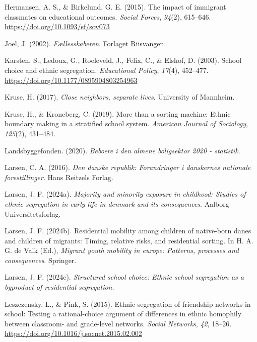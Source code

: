 \documentclass[
]{book}
\newlength{\cslhangindent}
\newenvironment{CSLReferences}[2] %
 {\begin{list}{}{%
  \setlength{\itemindent}{0pt}
  \setlength{\leftmargin}{0pt}
  \setlength{\parsep}{0pt}
  \ifodd #1
   \setlength{\leftmargin}{\cslhangindent}
   \setlength{\itemindent}{-1\cslhangindent}
  \fi
  \setlength{\itemsep}{#2\baselineskip}}}
 {\end{list}}
\begin{document}
\begin{CSLReferences}{1}{0}
Hermansen, A. S., \& Birkelund, G. E. (2015). The impact of immigrant classmates on educational outcomes. \emph{Social Forces}, \emph{94}(2), 615--646. \url{https://doi.org/10.1093/sf/sov073}

Joel, J. (2002). \emph{Fællesskaberen}. Forlaget Riisvangen.

Karsten, S., Ledoux, G., Roeleveld, J., Felix, C., \& Elshof, D. (2003). School choice and ethnic segregation. \emph{Educational Policy}, \emph{17}(4), 452--477. \url{https://doi.org/10.1177/0895904803254963}

Kruse, H. (2017). \emph{Close neighbors, separate lives}. University of Mannheim.

Kruse, H., \& Kroneberg, C. (2019). More than a sorting machine: Ethnic boundary making in a stratified school system. \emph{American Journal of Sociology}, \emph{125}(2), 431--484.

Landsbyggefonden. (2020). \emph{Beboere i den almene boligsektor 2020 - statistik}.

Larsen, C. A. (2016). \emph{Den danske republik: Forandringer i danskernes nationale forestillinger}. Hans Reitzels Forlag.

Larsen, J. F. (2024a). \emph{Majority and minority exposure in childhood: Studies of ethnic segregation in early life in denmark and its consequences}. Aalborg Universitetsforlag.

Larsen, J. F. (2024b). Residential mobility among children of native-born danes and children of migrants: Timing, relative risks, and residential sorting. In H. A. G. de Valk (Ed.), \emph{Migrant youth mobility in europe: Patterns, processes and consequences}. Springer.

Larsen, J. F. (2024c). \emph{Structured school choice: Ethnic school segregation as a byproduct of residential segregation}.

Leszczensky, L., \& Pink, S. (2015). Ethnic segregation of friendship networks in school: Testing a rational-choice argument of differences in ethnic homophily between classroom- and grade-level networks. \emph{Social Networks}, \emph{42}, 18--26. \url{https://doi.org/10.1016/j.socnet.2015.02.002}


\end{CSLReferences}
\end{document}
